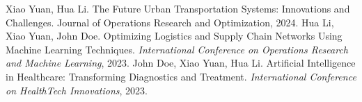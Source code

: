 \documentclass[a4paper, 10pt]{article}
\begin{document}
{Xiao Yuan}, Hua Li. The Future Urban Transportation Systems: Innovations and Challenges. {Journal of Operations Research and Optimization}, 2024.
Hua Li, {Xiao Yuan}, John Doe. Optimizing Logistics and Supply Chain Networks Using Machine Learning Techniques. \textit{International Conference on Operations Research and Machine Learning}, 2023.
John Doe, {Xiao Yuan}, Hua Li. Artificial Intelligence in Healthcare: Transforming Diagnostics and Treatment. \textit{International Conference on HealthTech Innovations}, 2023.
\end{document}
